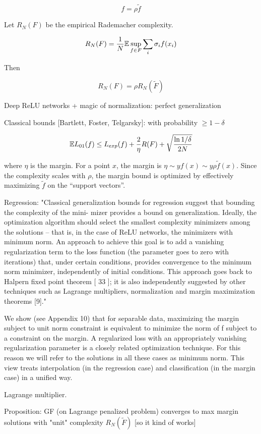 \documentclass[english]{article}
\begin{document}
$$f = \rho \tilde f$$

Let $R_N(F)$ be the empirical Rademacher complexity. 

$$R_N(F) = \frac1N \mathbb{E} \sup_{f\in F} \sum_i \sigma_if(x_i)$$

Then

$$R_N(F) = \rho R_N(\tilde F)$$


\item Deep ReLU networks + magic of normalization: perfect generalization

Classical bounds [Bartlett, Foster, Telgarsky]: with probability $\ge 1-\delta$

$$\mathbb{E} L_{01}(f) \le L_{exp}(f)
+ 
\frac2\eta R(F)
+ 
\sqrt{\frac{\ln 1/\delta}{2N}}
$$

where $\eta$ is the margin. For a point $x$, the margin is $\eta \sim yf(x)  \sim y \rho \tilde f(x)$. Since the complexity scales with $\rho$, the margin bound is optimized by effectively maximizing $\tilde f$
on the “support vectors”.

Regression: 
"Classical generalization bounds for regression suggest that bounding the complexity of the mini-
mizer provides a bound on generalization. Ideally, the optimization algorithm should select the
smallest complexity minimizers among the solutions – that is, in the case of ReLU networks,
the minimizers with minimum norm. An approach to achieve this goal is to add a vanishing
regularization term to the loss function (the parameter goes to zero with iterations) that, under
certain conditions, provides convergence to the minimum norm minimizer, independently of
initial conditions. This approach goes back to Halpern fixed point theorem [ 33 ]; it is also
independently suggested by other techniques such as Lagrange multipliers, normalization and
margin maximization theorems [9]."

We show (see Appendix 10) that for separable data, maximizing the margin subject to unit
norm constraint is equivalent to minimize the norm of f subject to a constraint on the margin.
A regularized loss with an appropriately vanishing regularization parameter is a closely related
optimization technique. For this reason we will refer to the solutions in all these cases as minimum
norm. This view treats interpolation (in the regression case) and classification (in the margin
case) in a unified way.

\item Lagrange multiplier. 

Proposition: GF (on Lagrange penalized problem) converges to max margin solutions with "unit" complexity $R_N(\tilde F)$ [so it kind of works]
\end{document}
